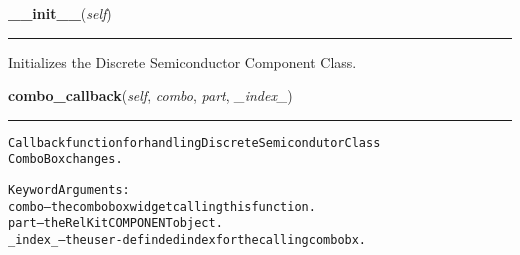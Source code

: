     \label{reliafree:semiconductors:semiconductor:Semiconductor:__init__}

    \vspace{0.5ex}

\hspace{.8\funcindent}\begin{boxedminipage}{\funcwidth}

    \raggedright \textbf{\_\_init\_\_}(\textit{self})

    \vspace{-1.5ex}

    \rule{\textwidth}{0.5\fboxrule}
\setlength{\parskip}{2ex}
    Initializes the Discrete Semiconductor Component Class.

\setlength{\parskip}{1ex}
    \end{boxedminipage}

    \label{reliafree:semiconductors:semiconductor:Semiconductor:combo_callback}

    \vspace{0.5ex}

\hspace{.8\funcindent}\begin{boxedminipage}{\funcwidth}

    \raggedright \textbf{combo\_callback}(\textit{self}, \textit{combo}, \textit{part}, \textit{\_index\_})

    \vspace{-1.5ex}

    \rule{\textwidth}{0.5\fboxrule}
\setlength{\parskip}{2ex}
\begin{alltt}
Callback function for handling Discrete Semicondutor Class
ComboBox changes.

Keyword Arguments:
  combo -- the combobox widget calling this function.
   part -- the RelKit COMPONENT object.
\_index\_ -- the user-definded index for the calling combobx.
\end{alltt}

\setlength{\parskip}{1ex}
    \end{boxedminipage}

